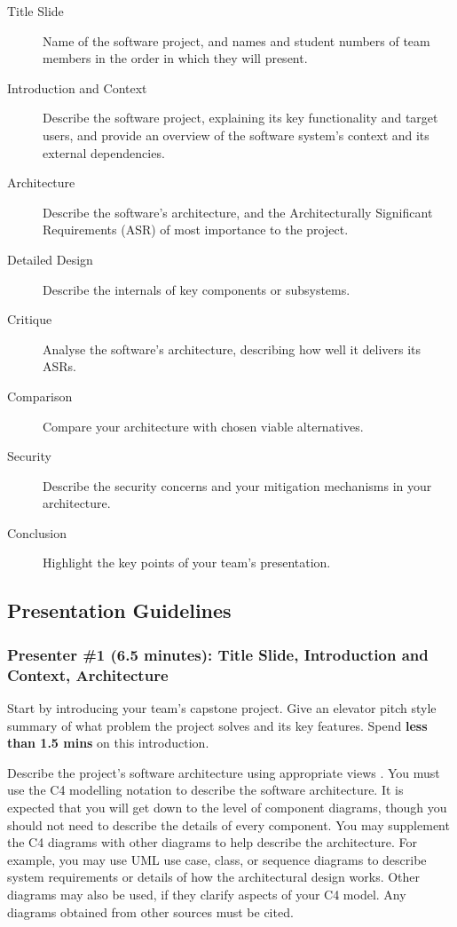 \documentclass{csse4400}
\begin{document}
\begin{description}
    \item[Title Slide] Name of the software project, and names and student numbers of team members in the order in which they will present.
    \item[Introduction and Context] Describe the software project, explaining its key functionality and target users, and provide an overview of the software system's context and its external dependencies.
    \item[Architecture] Describe the software's architecture, and the Architecturally Significant Requirements (ASR) of most importance to the project.
    \item[Detailed Design] Describe the internals of key components or subsystems.
    \item[Critique] Analyse the software's architecture, describing how well it delivers its ASRs.
    \item[Comparison] Compare your architecture with chosen viable alternatives.
    \item[Security] Describe the security concerns and your mitigation mechanisms in your architecture.
    \item[Conclusion] Highlight the key points of your team's presentation.
\end{description}

\subsection{Presentation Guidelines}

\subsubsection{Presenter \#1 (6.5 minutes): Title Slide, Introduction and Context, Architecture}

Start by introducing your team's capstone project.
Give an elevator pitch style summary of what problem the project solves and its key features.
Spend \textbf{less than 1.5 mins} on this introduction.

Describe the project's software architecture using appropriate views \cite{view-notes}.
You must use the C4 modelling notation \cite{view-notes} \cite{brown2026c4} to describe the software architecture.
It is expected that you will get down to the level of component diagrams,
though you should not need to describe the details of every component.
You may supplement the C4 diagrams with other diagrams to help describe the architecture.
For example, you may use UML use case, class, or sequence diagrams \cite{view-notes} \cite{uml}
to describe system requirements or details of how the architectural design works.
Other diagrams may also be used, if they clarify aspects of your C4 model.
Any diagrams obtained from other sources  must be cited.
\end{document}
